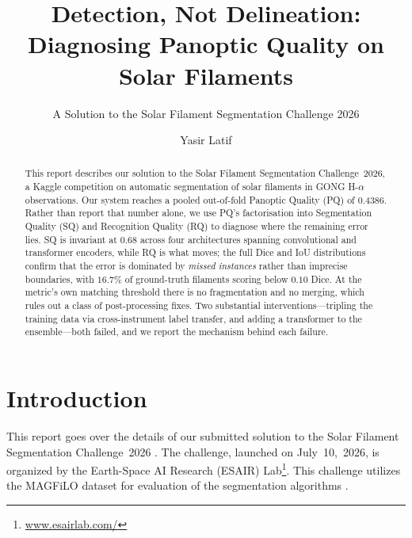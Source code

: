 \documentclass[sigconf]{acmart}
\begin{document}
\title{Detection, Not Delineation: Diagnosing Panoptic Quality on Solar Filaments}
\subtitle{A Solution to the Solar Filament Segmentation Challenge 2026} %


\author{Yasir Latif}

\begin{abstract}
    This report describes our solution to the Solar Filament Segmentation Challenge~2026, a Kaggle competition on automatic segmentation of solar filaments in GONG H-$\alpha$ observations. Our system reaches a pooled out-of-fold Panoptic Quality (PQ) of 0.4386. Rather than report that number alone, we use PQ's factorisation into Segmentation Quality (SQ) and Recognition Quality (RQ) to diagnose where the remaining error lies. SQ is invariant at $0.68$ across four architectures spanning convolutional and transformer encoders, while RQ is what moves; the full Dice and IoU distributions confirm that the error is dominated by \emph{missed instances} rather than imprecise boundaries, with $16.7\%$ of ground-truth filaments scoring below $0.10$ Dice. At the metric's own matching threshold there is no fragmentation and no merging, which rules out a class of post-processing fixes. Two substantial interventions---tripling the training data via cross-instrument label transfer, and adding a transformer to the ensemble---both failed, and we report the mechanism behind each failure.
\end{abstract}

\maketitle

\section{Introduction}
    This report goes over the details of our submitted solution to the Solar Filament Segmentation Challenge~2026 \cite{filament-segmentation-2026}. The challenge, launched on July~10,~2026, is organized by the Earth-Space AI Research (ESAIR) Lab\footnote{\href{https://www.esairlab.com/home}{www.esairlab.com/}}. This challenge utilizes the MAGFiLO dataset for evaluation of the segmentation algorithms \cite{ahmadzadeh2024dataset}.
\end{document}
